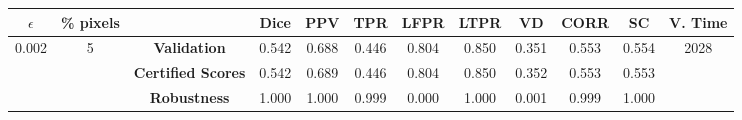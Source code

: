 \begin{longtable}{ c  c | c | c  c  c  c  c  c  c c c}
\toprule \textbf{$\epsilon$} & \textbf{\% pixels} & & \textbf{Dice} & \textbf{PPV} & \textbf{TPR} & \textbf{LFPR} & \textbf{LTPR} & \textbf{VD} & \textbf{CORR} & \textbf{SC} & \textbf{V. Time} \\
\midrule 
\multirow{3}{*}{0.002}  & \multirow{3}{*}{5} &\textbf{Validation} & 0.542 & 0.688 & 0.446 & 0.804 & 0.850 & 0.351 & 0.553 & 0.554 & \multirow{3}{*}{2028} \\
 & & \textbf{Certified Scores} & 0.542 & 0.689 & 0.446 & 0.804 & 0.850 & 0.352 & 0.553 & 0.553 & \\
& & \textbf{Robustness} & 1.000 & 1.000 & 0.999 & 0.000 & 1.000 & 0.001 & 0.999 & 1.000 & \\
\end{longtable}